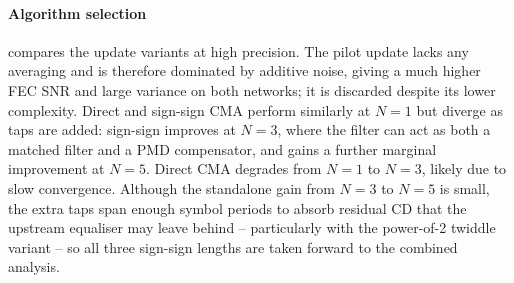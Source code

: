 \documentclass[12pt,a4paper]{article}
\begin{document}
\paragraph{Algorithm selection}
 compares the update variants at high precision. The pilot update lacks any averaging and is therefore dominated by additive noise, giving a much higher FEC SNR and large variance on both networks; it is discarded despite its lower complexity. Direct and sign-sign CMA perform similarly at $N=1$ but diverge as taps are added: sign-sign improves at $N=3$, where the filter can act as both a matched filter and a PMD compensator, and gains a further marginal improvement at $N=5$. Direct CMA degrades from $N=1$ to $N=3$, likely due to slow convergence. Although the standalone gain from $N=3$ to $N=5$ is small, the extra taps span enough symbol periods to absorb residual CD that the upstream equaliser may leave behind -- particularly with the power-of-2 twiddle variant -- so all three sign-sign lengths are taken forward to the combined analysis.
\end{document}
